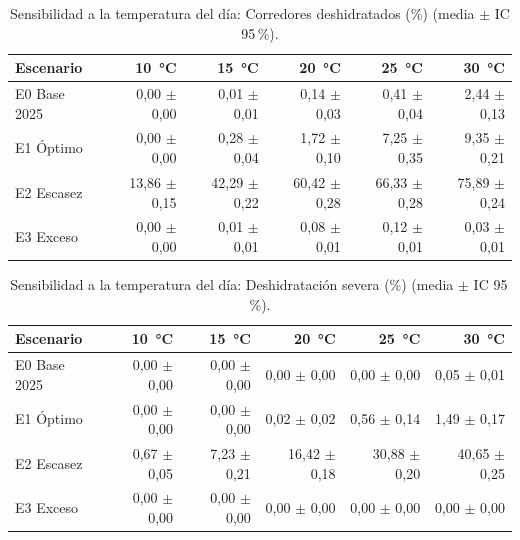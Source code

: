 \documentclass[11pt,a4paper]{article}
\begin{document}
\begin{table}[H]
\centering
\small
\begin{tabular}{lrrrrr}
\toprule
\textbf{Escenario} & \textbf{10 \,°C} & \textbf{15 \,°C} & \textbf{20 \,°C} & \textbf{25 \,°C} & \textbf{30 \,°C} \\
\midrule
E0 Base 2025 & 0,00 $\pm$ 0,00 & 0,01 $\pm$ 0,01 & 0,14 $\pm$ 0,03 & 0,41 $\pm$ 0,04 & 2,44 $\pm$ 0,13 \\
E1 Óptimo & 0,00 $\pm$ 0,00 & 0,28 $\pm$ 0,04 & 1,72 $\pm$ 0,10 & 7,25 $\pm$ 0,35 & 9,35 $\pm$ 0,21 \\
E2 Escasez & 13,86 $\pm$ 0,15 & 42,29 $\pm$ 0,22 & 60,42 $\pm$ 0,28 & 66,33 $\pm$ 0,28 & 75,89 $\pm$ 0,24 \\
E3 Exceso & 0,00 $\pm$ 0,00 & 0,01 $\pm$ 0,01 & 0,08 $\pm$ 0,01 & 0,12 $\pm$ 0,01 & 0,03 $\pm$ 0,01 \\
\bottomrule
\end{tabular}
\caption{Sensibilidad a la temperatura del día: Corredores deshidratados (\%) (media $\pm$ IC 95\,\%).}
\label{tab:sens-corredoresde}
\end{table}

\begin{table}[H]
\centering
\small
\begin{tabular}{lrrrrr}
\toprule
\textbf{Escenario} & \textbf{10 \,°C} & \textbf{15 \,°C} & \textbf{20 \,°C} & \textbf{25 \,°C} & \textbf{30 \,°C} \\
\midrule
E0 Base 2025 & 0,00 $\pm$ 0,00 & 0,00 $\pm$ 0,00 & 0,00 $\pm$ 0,00 & 0,00 $\pm$ 0,00 & 0,05 $\pm$ 0,01 \\
E1 Óptimo & 0,00 $\pm$ 0,00 & 0,00 $\pm$ 0,00 & 0,02 $\pm$ 0,02 & 0,56 $\pm$ 0,14 & 1,49 $\pm$ 0,17 \\
E2 Escasez & 0,67 $\pm$ 0,05 & 7,23 $\pm$ 0,21 & 16,42 $\pm$ 0,18 & 30,88 $\pm$ 0,20 & 40,65 $\pm$ 0,25 \\
E3 Exceso & 0,00 $\pm$ 0,00 & 0,00 $\pm$ 0,00 & 0,00 $\pm$ 0,00 & 0,00 $\pm$ 0,00 & 0,00 $\pm$ 0,00 \\
\bottomrule
\end{tabular}
\caption{Sensibilidad a la temperatura del día: Deshidratación severa (\%) (media $\pm$ IC 95\,\%).}
\label{tab:sens-deshidrataci}
\end{table}
\end{document}

